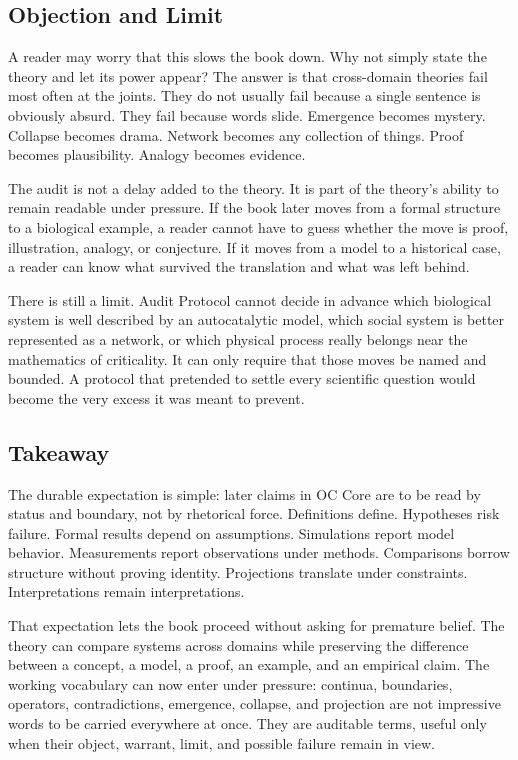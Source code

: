 \documentclass[11pt,a4paper,openany]{book}
\begin{document}
\subsection{Objection and Limit}
A reader may worry that this slows the book down. Why not simply state the theory and let its power appear? The answer is that cross-domain theories fail most often at the joints. They do not usually fail because a single sentence is obviously absurd. They fail because words slide. Emergence becomes mystery. Collapse becomes drama. Network becomes any collection of things. Proof becomes plausibility. Analogy becomes evidence. \cite{kauffman_autocatalytic,raf_networks}\par
The audit is not a delay added to the theory. It is part of the theory's ability to remain readable under pressure. If the book later moves from a formal structure to a biological example, a reader cannot have to guess whether the move is proof, illustration, analogy, or conjecture. If it moves from a model to a historical case, a reader can know what survived the translation and what was left behind.\par
There is still a limit. Audit Protocol cannot decide in advance which biological system is well described by an autocatalytic model, which social system is better represented as a network, or which physical process really belongs near the mathematics of criticality. It can only require that those moves be named and bounded. A protocol that pretended to settle every scientific question would become the very excess it was meant to prevent.\par
\subsection{Takeaway}
The durable expectation is simple: later claims in OC Core are to be read by status and boundary, not by rhetorical force. Definitions define. Hypotheses risk failure. Formal results depend on assumptions. Simulations report model behavior. Measurements report observations under methods. Comparisons borrow structure without proving identity. Projections translate under constraints. Interpretations remain interpretations. \cite{kauffman_autocatalytic,raf_networks}\par
That expectation lets the book proceed without asking for premature belief. The theory can compare systems across domains while preserving the difference between a concept, a model, a proof, an example, and an empirical claim. The working vocabulary can now enter under pressure: continua, boundaries, operators, contradictions, emergence, collapse, and projection are not impressive words to be carried everywhere at once. They are auditable terms, useful only when their object, warrant, limit, and possible failure remain in view.\par
\end{document}
